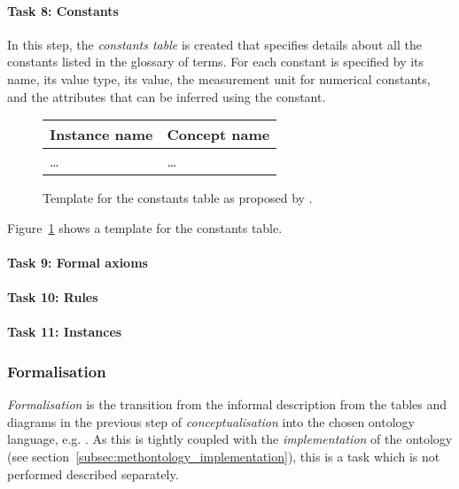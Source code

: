 \paragraph{Task 8: Constants}

In this step, the \emph{constants table} is created that specifies details about all the constants listed in the glossary of terms. For each constant is specified by its name, its value type, its value, the measurement unit for numerical constants, and the attributes that can be inferred using the constant.

\begin{figure}
\centering
\begin{tabular}{|p{}|p{}|}
  \hline
  \textbf{Instance name} & \textbf{Concept name} \\
  \hline\hline
  … & … \\
  \hline
\end{tabular}
\caption{Template for the constants table as proposed by \methontology.}
\label{fig:methontology_example_constants}
\end{figure}

Figure~\ref{fig:methontology_example_constants} shows a template for the constants table.

\paragraph{Task 9: Formal axioms}



\paragraph{Task 10: Rules}



\paragraph{Task 11: Instances}



\subsubsection{Formalisation}

\emph{Formalisation} is the transition from the informal description from the tables and diagrams in the previous step of \emph{conceptualisation} into the chosen ontology language, e.g. . As this is tightly coupled with the \emph{implementation} of the ontology (see section~\ref{subsec:methontology_implementation}), this is a task which is not performed described separately.

